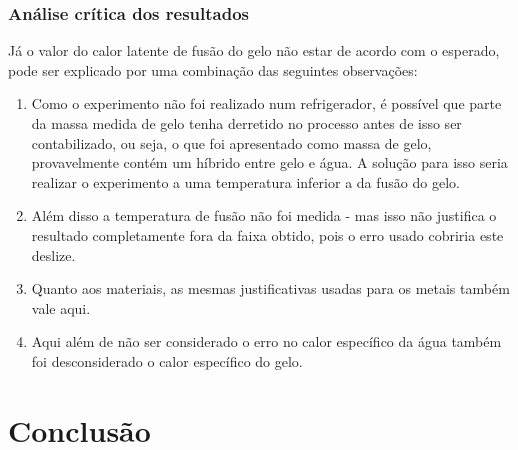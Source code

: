 \documentclass[a4paper]{article}
\begin{document}
			\subsubsection{Análise crítica dos resultados}
				Já o valor do calor latente de fusão do gelo não estar de acordo com o esperado,
				pode ser explicado por uma combinação das seguintes observações:
					\begin{enumerate}
						\item Como o experimento não foi realizado num refrigerador, é possível
						que parte da massa medida de gelo tenha derretido no processo antes
						de isso ser contabilizado, ou seja, o que foi apresentado como massa
						de gelo, provavelmente contém um híbrido entre gelo e água. A solução
						para isso seria realizar o experimento a uma temperatura inferior
						a da fusão do gelo.
						\item Além disso a temperatura de fusão não foi medida - mas isso não justifica
						o resultado completamente fora da faixa obtido, pois o erro usado cobriria este deslize.
						\item Quanto aos materiais, as mesmas justificativas usadas para os metais
						também vale aqui.
						\item Aqui além de não ser considerado o erro no calor específico da água
						também foi desconsiderado o calor específico do gelo.
					\end{enumerate}



	\section{Conclusão}
\end{document}
